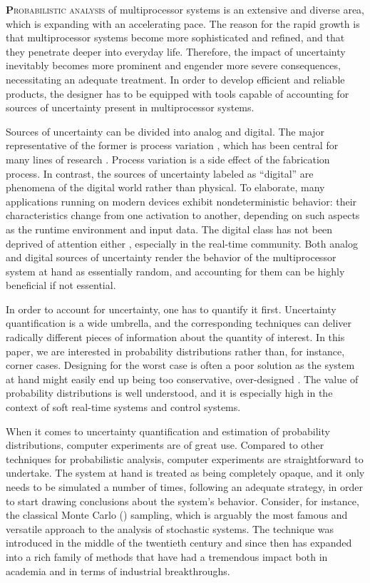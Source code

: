 \lettrine[findent=0.4em, nindent=0em]{\textbf{P}}{robabilistic analysis} of
multiprocessor systems is an extensive and diverse area, which is expanding with
an accelerating pace. The reason for the rapid growth is that multiprocessor
systems become more sophisticated and refined, and that they penetrate deeper
into everyday life. Therefore, the impact of uncertainty inevitably becomes more
prominent and engender more severe consequences, necessitating an adequate
treatment. In order to develop efficient and reliable products, the designer has
to be equipped with tools capable of accounting for sources of uncertainty
present in multiprocessor systems.

Sources of uncertainty can be divided into analog and digital. The major
representative of the former is process variation \cite{srivastava2005}, which
has been central for many lines of research \cite{bhardwaj2008, juan2012,
lee2013, ukhov2014, ukhov2015}. Process variation is a side effect of the
fabrication process. In contrast, the sources of uncertainty labeled as
``digital'' are phenomena of the digital world rather than physical. To
elaborate, many applications running on modern devices exhibit nondeterministic
behavior: their characteristics change from one activation to another, depending
on such aspects as the runtime environment and input data. The digital class has
not been deprived of attention either \cite{diaz2002, santinelli2011,
quinton2012, yang2013, tanasa2015}, especially in the real-time community. Both
analog and digital sources of uncertainty render the behavior of the
multiprocessor system at hand as essentially random, and accounting for them can
be highly beneficial if not essential.

In order to account for uncertainty, one has to quantify it first. Uncertainty
quantification is a wide umbrella, and the corresponding techniques can deliver
radically different pieces of information about the quantity of interest. In
this paper, we are interested in probability distributions rather than, for
instance, corner cases. Designing for the worst case is often a poor solution as
the system at hand might easily end up being too conservative, over-designed
\cite{quinton2012}. The value of probability distributions is well understood,
and it is especially high in the context of soft real-time systems and control
systems.

When it comes to uncertainty quantification and estimation of probability
distributions, computer experiments \cite{santner2003} are of great use.
Compared to other techniques for probabilistic analysis, computer experiments
are straightforward to undertake. The system at hand is treated as being
completely opaque, and it only needs to be simulated a number of times,
following an adequate strategy, in order to start drawing conclusions about the
system's behavior. Consider, for instance, the classical Monte Carlo ()
sampling, which is arguably the most famous and versatile approach to the
analysis of stochastic systems. The technique was introduced in the middle of
the twentieth century and since then has expanded into a rich family of methods
that have had a tremendous impact both in academia and in terms of industrial
breakthroughs.

